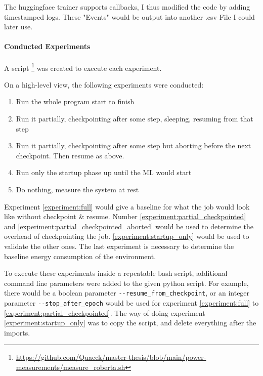 The huggingface trainer supports callbacks, I thus modified the code by adding timestamped logs. These "Events" would be output into another .csv File I could later use.

\paragraph{Conducted Experiments}

A script \footnote{\url{https://github.com/Quacck/master-thesis/blob/main/power-measurements/measure_roberta.sh}} was created to execute each experiment. 

On a high-level view, the following experiments were conducted: 

\begin{enumerate}
    \item \label{experiment:full}Run the whole program start to finish
    \item \label{experiment:partial_checkpointed}Run it partially, checkpointing after some step, sleeping, resuming from that step
    \item \label{experiment:partial_checkpointed_aborted}Run it partially, checkpointing after some step but aborting before the next checkpoint. Then resume as above.
    \item \label{experiment:startup_only}Run only the startup phase up until the ML would start
    \item \label{experiment:baseline}Do nothing, measure the system at rest
\end{enumerate}

Experiment \ref{experiment:full} would give a baseline for what the job would look like without checkpoint \& resume. Number \ref{experiment:partial_checkpointed} and \ref{experiment:partial_checkpointed_aborted} would be used to determine the overhead of checkpointing the job. \ref{experiment:startup_only} would be used to validate the other ones. The last experiment is necessary to determine the baseline energy consumption of the environment.

To execute these experiments inside a repeatable bash script, additional command line parameters were added to the given python script. 
For example, there would be a boolean parameter \verb|--resume_from_checkpoint|, or an integer parameter \verb|--stop_after_epoch| would be used for experiment \ref{experiment:full} to \ref{experiment:partial_checkpointed}. 
The way of doing experiment \ref{experiment:startup_only} was to copy the script, and delete everything after the imports.

